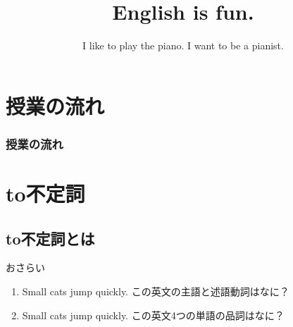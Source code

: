 \documentclass[aspectratio=169,xcolor={dvipsnames,table}]{beamer}
\title{English is fun.}
\subtitle{I like to play the piano. I want to be a pianist.}
\author{}
\institute[]{}
\date[]
\begin{document}
\begin{frame}[plain]
  \titlepage
\end{frame}


\section*{授業の流れ}
\begin{frame}[plain]
  \frametitle{授業の流れ}
  \tableofcontents
\end{frame}

\section{to不定詞}
\subsection{to不定詞とは}
\begin{frame}[plain]{おさらい}
\Large

\begin{enumerate}
 \item<1-> Small cats jump quickly.%
      \hfill{\small この英文の主語と述語動詞はなに？}
 \item<3-> Small cats jump quickly.%
      \hfill{\small この英文4つの単語の品詞はなに？}\\
	\visible<4->{{\small \Circled{ 形 }\hspace{25pt}\Circled{ 名 }\hspace{15pt}\Circled{ 動 }\hspace{24pt}\Circled{ 副 }}}
\end{enumerate}


\end{frame}
\end{document}
